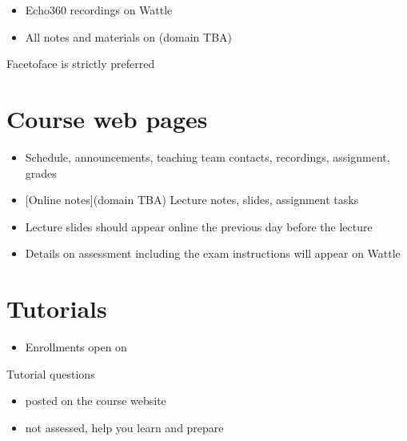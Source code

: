 \documentclass[letterpaper,10pt,english]{jupyterBook}
\begin{document}
\sphinxAtStartPar
{}
\begin{itemize}
\item {} 
\sphinxAtStartPar
Echo\sphinxhyphen{}360 recordings on Wattle

\item {} 
\sphinxAtStartPar
All notes and materials on (domain TBA)

\end{itemize}

\sphinxAtStartPar
Face\sphinxhyphen{}to\sphinxhyphen{}face is strictly preferred


\section{Course web pages}
\label{\detokenize{00.intro:course-web-pages}}\begin{itemize}
\item {} 
\sphinxAtStartPar
{}
Schedule, announcements, teaching team contacts, recordings, assignment, grades

\item {} 
\sphinxAtStartPar
{[}Online notes{]}(domain TBA)
Lecture notes, slides, assignment tasks

\item {} 
\sphinxAtStartPar
Lecture slides should appear online the previous day before the lecture

\item {} 
\sphinxAtStartPar
Details on assessment including the exam instructions will appear on Wattle

\end{itemize}


\section{Tutorials}
\label{\detokenize{00.intro:tutorials}}\begin{itemize}
\item {} 
\sphinxAtStartPar
Enrollments open on 

\end{itemize}

\sphinxAtStartPar
Tutorial questions
\begin{itemize}
\item {} 
\sphinxAtStartPar
posted on the course website

\item {} 
\sphinxAtStartPar
not assessed, help you learn and prepare

\end{itemize}
\end{document}
